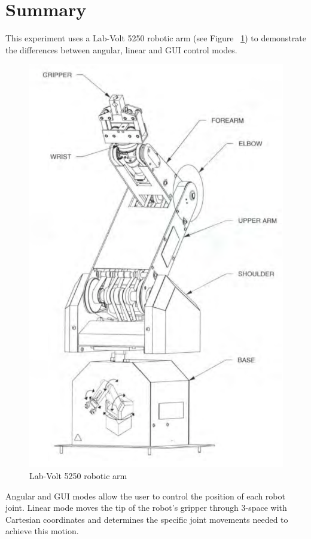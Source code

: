 \section{Summary}\label{sec:summary}
This experiment uses a Lab-Volt 5250 robotic arm (see Figure ~\ref{fig:arm}) to demonstrate the differences between angular, linear and GUI control modes.
\begin{figure}[tbph]
  \centering
  \includegraphics[width=0.4\linewidth]{graphics/arm}
  \caption{Lab-Volt 5250 robotic arm}
  \label{fig:arm}
\end{figure}

Angular and GUI modes allow the user to control the position of each robot joint.
Linear mode moves the tip of the robot's gripper through 3-space with Cartesian coordinates and determines the specific joint movements needed to achieve this motion.
